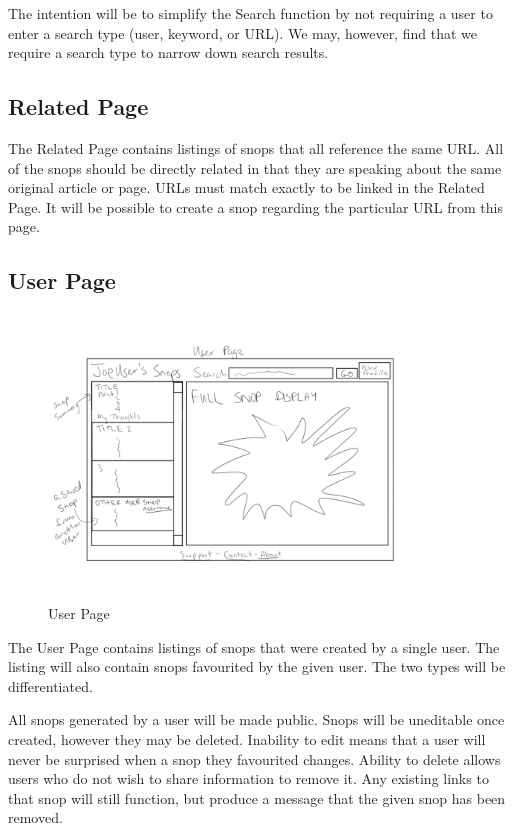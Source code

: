 \documentclass[11pt]{article}
\begin{document}
The intention will be to simplify the Search function by not requiring a user to enter a search type (user, keyword, or URL). We may, however, find that we require a search type to narrow down search results.
\subsection{Related Page}
The Related Page contains listings of snops that all reference the same URL. All of the snops should be directly related in that they are speaking about the same original article or page. URLs must match exactly to be linked in the Related Page. It will be possible to create a snop regarding the particular URL from this page. 
\subsection{User Page}
\begin{figure}[htb]
\begin{center}
\includegraphics[width=0.9\textwidth]{user_page.png}
\caption{User Page}
\label{fig:fig_user_page}
\end{center}
\end{figure}
The User Page contains listings of snops that were created by a single user. The listing will also contain snops favourited by the given user. The two types will be differentiated. 

All snops generated by a user will be made public. Snops will be uneditable once created, however they may be deleted. Inability to edit means that a user will never be surprised when a snop they favourited changes. Ability to delete allows users who do not wish to share information to remove it. Any existing links to that snop will still function, but produce a message that the given snop has been removed. 
\end{document}
